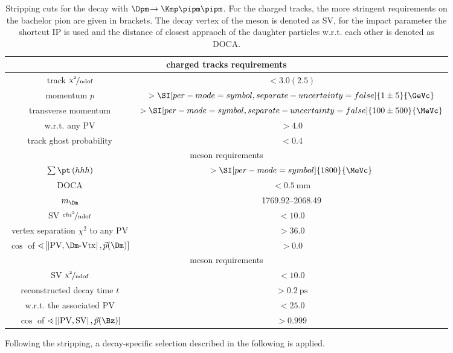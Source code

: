 \begin{table}[tbp]
	\centering
	\caption{Stripping cuts for the decay \BdToDpi with $\Dpm\!\to\Kmp\pipm\pipm$.
	For the charged tracks, the more stringent requirements on the bachelor pion are given in brackets.
	The decay vertex of the \Bz meson is denoted as \ac{SV}, for the impact parameter the shortcut IP is used and the distance of closest appraoch of the \Dm daughter particles w.r.t. each other is denoted as DOCA.}
	\begin{tabular}{cc}
		\toprule
		\multicolumn{2}{c}{charged tracks requirements}\\
		\midrule
		track $\nicefrac{\chi^2}{\text{ndof}}$		& $<3.0 (2.5)$ \\
		momentum $p$ 								& $>\SI[per-mode=symbol, separate-uncertainty=false]{1\pm5}{\GeVc}$ \\
		transverse momentum \pt 					& $>\SI[per-mode=symbol, separate-uncertainty=false]{100\pm500}{\MeVc}$ \\
		\chisqip w.r.t. any \ac{PV}				& $>4.0$ \\
		track ghost probability 					& $<0.4$ \\
		\midrule
		\multicolumn{2}{c}{\Dm meson requirements}\\
		\midrule
		$\sum \pt\left(hhh\right)$ 																				& $>\SI[per-mode=symbol]{1800}{\MeVc}$ \\
		DOCA 																									& $<\SI{0.5}{\milli\metre}$ \\
		$m_\Dm$ 																								& \SIrange[per-mode=symbol,range-units=single]{1769.92}{2068.49}{\MeVcc} \\
		\ac{SV} $\nicefrac{chi^2}{\text{ndof}}$ 																	& $<10.0$ \\
		vertex separation $\chi^2$ to any \ac{PV} 																	& $>36.0$ \\
		$\cos$ of $\sphericalangle\left[\left|\text{PV},\Dm\text{-Vtx}\right|, \vec{p}\!\left(\Dm\right)\right]$	& $>0.0$ \\
		\midrule
		\multicolumn{2}{c}{\Bz meson requirements}\\
		\midrule
		\ac{SV} $\nicefrac{\chi^2}{\text{ndof}}$ 																& $<10.0$ \\
		reconstructed decay time $t$ 																			& $>\SI{0.2}{\pico\second}$ \\
		\chisqip w.r.t. the associated \ac{PV} 																& $<25.0$ \\
		$\cos$ of $\sphericalangle\left[\left|\text{PV},\text{SV}\right|, \vec{p}\!\left(\Bz\right)\right]$		& $>0.999$ \\
		\bottomrule
	\end{tabular}
	\label{tab:stripping}
\end{table}
Following the stripping, a decay-specific selection described in the following is applied.

